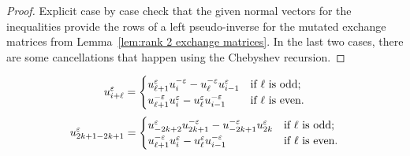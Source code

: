 \documentclass{amsart}
\numberwithin{theorem}{section}
\begin{document}
  \begin{proof}
    Explicit case by case check that the given normal vectors for the inequalities provide the rows of a left pseudo-inverse for the mutated exchange matrices from Lemma~\ref{lem:rank 2 exchange matrices}.
    In the last two cases, there are some cancellations that happen using the Chebyshev recursion.
  \end{proof}

  \begin{equation}
    u_{i+\ell}^\varepsilon=\begin{cases} u_{\ell+1}^\varepsilon u_i^{-\varepsilon}-u_\ell^{-\varepsilon} u_{i-1}^\varepsilon & \text{\upshape if $\ell$ is odd;}\\ u_{\ell+1}^{-\varepsilon} u_i^\varepsilon-u_\ell^\varepsilon u_{i-1}^{-\varepsilon} & \text{\upshape if $\ell$ is even.} \end{cases}
  \end{equation}
  \begin{equation}
    u_{2k+1-2k+1}^\varepsilon=\begin{cases} u_{-2k+2}^\varepsilon u_{2k+1}^{-\varepsilon}-u_{-2k+1}^{-\varepsilon} u_{2k}^\varepsilon & \text{\upshape if $\ell$ is odd;}\\ u_{\ell+1}^{-\varepsilon} u_i^\varepsilon-u_\ell^\varepsilon u_{i-1}^{-\varepsilon} & \text{\upshape if $\ell$ is even.} \end{cases}
  \end{equation}
\end{document}
